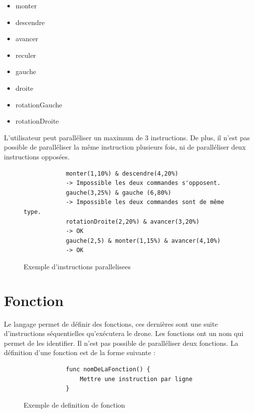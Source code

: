 \documentclass[12pt, openany]{report}
\begin{document}
    \begin{itemize}
        \item monter
        \item descendre
        \item avancer
        \item reculer
        \item gauche
        \item droite
        \item rotationGauche
        \item rotationDroite
    \end{itemize}
    
L'utilisateur peut paralléliser un maximum de 3 instructions.
De plus, il n'est pas possible de paralléliser la même instruction plusieurs fois, ni de paralléliser deux instructions opposées.

    \begin{figure}[h!]
        \begin{center}
            \begin{Verbatim}
            monter(1,10%) & descendre(4,20%)
            -> Impossible les deux commandes s'opposent.
            gauche(3,25%) & gauche (6,80%)
            -> Impossible les deux commandes sont de même type.
            rotationDroite(2,20%) & avancer(3,20%) 
            -> OK
            gauche(2,5) & monter(1,15%) & avancer(4,10%)
            -> OK
            \end{Verbatim}
        \end{center}
        \caption{Exemple d'instructions parallelisees}
        \label{Exemple d'instructions parallelisees}
    \end{figure}

\section{Fonction}
Le langage permet de définir des fonctions, ces dernières sont une suite d'instructions séquentielles qu'exécutera le drone.
Les fonctions ont un nom qui permet de les identifier.
Il n'est pas possible de paralléliser deux fonctions.
La définition d'une fonction est de la forme suivante :

    \begin{figure}[h!]
        \begin{center}
            \begin{Verbatim}
            func nomDeLaFonction() {
                Mettre une instruction par ligne
            }
            \end{Verbatim}
        \end{center}
        \caption{Exemple de definition de fonction}
        \label{Exemple de definition de fonction}
    \end{figure}
    
\end{document}
